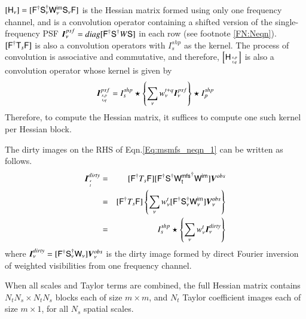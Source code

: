 \documentclass[structabstract]{stylefiles/aa}
\newcommand{\F}{{\tens{F}}}
\newcommand{\Fd}{{\tens{F^\dag}}}
\newcommand{\He}{{\tens{H}}}
\newcommand{\Sa}{{\tens{S}}}
\newcommand{\Sd}{{\tens{S^\dag}}}
\newcommand{\Sna}{\tens{{S_{\nu}}}}
\newcommand{\Snd}{\tens{{S_{\nu}^\dag}}}
\newcommand{\T}{{\tens{T}}}
\newcommand{\W}{{\tens{W}}}
\newcommand{\Wim}{{\tens{W^{im}}}}
\newcommand{\Wntd}{{\tens{{W^{mfs}_t}^\dag}}}
\newcommand{\Wimn}{{\tens{W^{im}_{\nu}}}}
\newcommand{\wnt}{{w_{\nu}^t}}
\newcommand{\wntq}{{w_{\nu}^{t+q}}}
\newcommand{\I}{{\vec{I}}}
\begin{document}
$[\He_{\nu}] =  [\Fd\Snd\Wimn\Sna\F]$ is the Hessian matrix formed using only one
 frequency channel, and
is a convolution operator containing a shifted version of the single-frequency 
PSF $\I^{psf}_{\nu} = diag[\Fd \Sd W \Sa]$ in each row (see footnote \vref{FN:Neqn}).
$[\Fd \T_s\F]$ is also a convolution operators with $I^{shp}_s$ as 
the kernel. 
The process of convolution is associative and commutative, and 
therefore, $\left[\He_{{s,p}\atop{t,q}}\right]$  is also a convolution operator 
whose kernel is given by 
\begin{equation}
\label{Eq:msmfs_neqn_2.5}
\vec{I}^{psf}_{{s,p}\atop{t,q}} = I^{shp}_s  \star \left\{ \sum_{\nu} \wntq \vec{I}^{psf}_{\nu} \right\} \star I^{shp}_p 
\end{equation}
Therefore, to compute the Hessian matrix, it suffices to compute one such kernel
per Hessian block.


The dirty images on the RHS of Eqn.\ref{Eq:msmfs_neqn_1} can be written as follows.
\begin{eqnarray}
\label{Eq:msmfs_neqn_3}
\vec{I}^{dirty}_{{s}\atop{t}}  &=& [\Fd T_s \F][\Fd\Sd\Wntd\Wim] \vec{V}^{obs} \\
&=& [\Fd T_s \F] \left\{  \sum_{\nu} \wnt [\Fd\Snd\Wimn] \vec{V}_{\nu}^{obs}  \right\} \\
&=& I^{shp}_s \star \left\{\sum_{\nu} \wnt \vec{I}^{dirty}_{\nu}  \right\} 
\label{Eq:mf_neqn_3a}
\end{eqnarray}
where ${\I}_{\nu}^{dirty} = [\Fd \Snd \W_{\nu}] \vec{V}^{obs}_{\nu} $ is the dirty
image formed by direct Fourier inversion of weighted visibilities from one frequency channel.


When all scales and Taylor terms are combined, 
the full Hessian matrix contains
$N_t N_s \times N_t N_s$ blocks each of size $m\times m$, 
and $N_t$ Taylor coefficient images each of size $m\times 1$, 
for all $N_s$ spatial scales.
\end{document}

